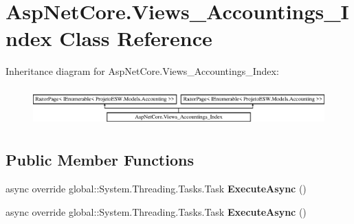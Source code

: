 \hypertarget{class_asp_net_core_1_1_views___accountings___index}{}\section{Asp\+Net\+Core.\+Views\+\_\+\+Accountings\+\_\+\+Index Class Reference}
\label{class_asp_net_core_1_1_views___accountings___index}
Inheritance diagram for Asp\+Net\+Core.\+Views\+\_\+\+Accountings\+\_\+\+Index\+:\begin{figure}[H]
\begin{center}
\leavevmode
\includegraphics[height=1.493333cm]{class_asp_net_core_1_1_views___accountings___index}
\end{center}
\end{figure}
\subsection*{Public Member Functions}
\begin{DoxyCompactItemize}
\item 
\mbox{\label{class_asp_net_core_1_1_views___accountings___index_ad368dcd72061f7bb27d831742d663e89}} 
async override global\+::\+System.\+Threading.\+Tasks.\+Task {\bfseries Execute\+Async} ()
\item 
\mbox{\label{class_asp_net_core_1_1_views___accountings___index_ad368dcd72061f7bb27d831742d663e89}} 
async override global\+::\+System.\+Threading.\+Tasks.\+Task {\bfseries Execute\+Async} ()
\end{DoxyCompactItemize}

